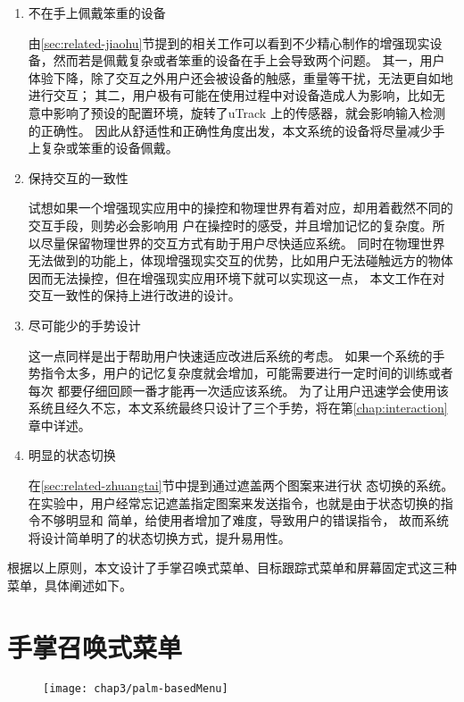 \label{sec:design-principle}
\begin{enumerate}
\item 不在手上佩戴笨重的设备

由\ref{sec:related-jiaohu}节提到的相关工作可以看到不少精心制作的增强现实设备，然而若是佩戴复杂或者笨重的设备在手上会导致两个问题。
其一，用户体验下降，除了交互之外用户还会被设备的触感，重量等干扰，无法更自如地进行交互；
其二，用户极有可能在使用过程中对设备造成人为影响，比如无意中影响了预设的配置环境，旋转了uTrack
上的传感器，就会影响输入检测的正确性。
因此从舒适性和正确性角度出发，本文系统的设备将尽量减少手上复杂或笨重的设备佩戴。

\item 保持交互的一致性

试想如果一个增强现实应用中的操控和物理世界有着对应，却用着截然不同的交互手段，则势必会影响用
户在操控时的感受，并且增加记忆的复杂度。所以尽量保留物理世界的交互方式有助于用户尽快适应系统。
同时在物理世界无法做到的功能上，体现增强现实交互的优势，比如用户无法碰触远方的物体因而无法操控，但在增强现实应用环境下就可以实现这一点，
本文工作在对交互一致性的保持上进行改进的设计。

\item 尽可能少的手势设计

这一点同样是出于帮助用户快速适应改进后系统的考虑。
如果一个系统的手势指令太多，用户的记忆复杂度就会增加，可能需要进行一定时间的训练或者每次
都要仔细回顾一番才能再一次适应该系统。
为了让用户迅速学会使用该系统且经久不忘，本文系统最终只设计了三个手势，将在第\ref{chap:interaction}章中详述。

\item 明显的状态切换

在\ref{sec:related-zhuangtai}节中提到通过遮盖两个图案来进行状
态切换的系统。
在实验中，用户经常忘记遮盖指定图案来发送指令，也就是由于状态切换的指令不够明显和
简单，给使用者增加了难度，导致用户的错误指令，
故而系统将设计简单明了的状态切换方式，提升易用性。

\end{enumerate}

根据以上原则，本文设计了手掌召唤式菜单、目标跟踪式菜单和屏幕固定式这三种菜单，具体阐述如下。


\section{手掌召唤式菜单}
\label{sec:palm-based}
\begin{figure}[!htp]
  \centering
  \texttt{[image: chap3/palm-basedMenu]}
\end{figure}

